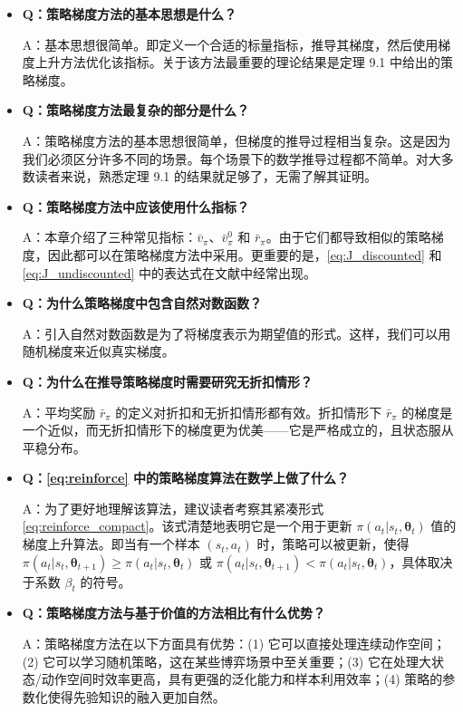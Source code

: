 \documentclass[UTF8]{article}
\begin{document}
\begin{itemize}
    \item \textbf{Q：策略梯度方法的基本思想是什么？}

    A：基本思想很简单。即定义一个合适的标量指标，推导其梯度，然后使用梯度上升方法优化该指标。关于该方法最重要的理论结果是定理 9.1 中给出的策略梯度。

    \item \textbf{Q：策略梯度方法最复杂的部分是什么？}

    A：策略梯度方法的基本思想很简单，但梯度的推导过程相当复杂。这是因为我们必须区分许多不同的场景。每个场景下的数学推导过程都不简单。对大多数读者来说，熟悉定理 9.1 的结果就足够了，无需了解其证明。

    \item \textbf{Q：策略梯度方法中应该使用什么指标？}

    A：本章介绍了三种常见指标：$\bar{v}_\pi$、$\bar{v}_\pi^0$ 和 $\bar{r}_\pi$。由于它们都导致相似的策略梯度，因此都可以在策略梯度方法中采用。更重要的是，\eqref{eq:J_discounted} 和 \eqref{eq:J_undiscounted} 中的表达式在文献中经常出现。

    \item \textbf{Q：为什么策略梯度中包含自然对数函数？}

    A：引入自然对数函数是为了将梯度表示为期望值的形式。这样，我们可以用随机梯度来近似真实梯度。

    \item \textbf{Q：为什么在推导策略梯度时需要研究无折扣情形？}

    A：平均奖励 $\bar{r}_\pi$ 的定义对折扣和无折扣情形都有效。折扣情形下 $\bar{r}_\pi$ 的梯度是一个近似，而无折扣情形下的梯度更为优美——它是严格成立的，且状态服从平稳分布。

    \item \textbf{Q：\eqref{eq:reinforce} 中的策略梯度算法在数学上做了什么？}

    A：为了更好地理解该算法，建议读者考察其紧凑形式 \eqref{eq:reinforce_compact}。该式清楚地表明它是一个用于更新 $\pi(a_t|s_t, \boldsymbol{\theta}_t)$ 值的梯度上升算法。即当有一个样本 $(s_t, a_t)$ 时，策略可以被更新，使得 $\pi(a_t|s_t, \boldsymbol{\theta}_{t+1}) \geq \pi(a_t|s_t, \boldsymbol{\theta}_t)$ 或 $\pi(a_t|s_t, \boldsymbol{\theta}_{t+1}) < \pi(a_t|s_t, \boldsymbol{\theta}_t)$，具体取决于系数 $\beta_t$ 的符号。

    \item \textbf{Q：策略梯度方法与基于价值的方法相比有什么优势？}

    A：策略梯度方法在以下方面具有优势：(1) 它可以直接处理连续动作空间；(2) 它可以学习随机策略，这在某些博弈场景中至关重要；(3) 它在处理大状态/动作空间时效率更高，具有更强的泛化能力和样本利用效率；(4) 策略的参数化使得先验知识的融入更加自然。


\end{itemize}
\end{document}
